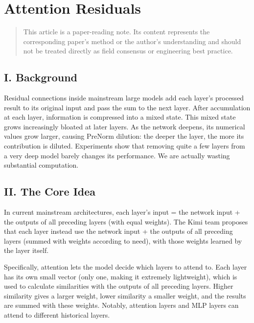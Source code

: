 \setcounter{section}{3}

\hypertarget{attention-residuals}{%
\section{Attention Residuals}\label{attention-residuals}}

\begin{quote}
This article is a paper-reading note. Its content represents the corresponding paper's method or the author's understanding and should not be treated directly as field consensus or engineering best practice.
\end{quote}

\hypertarget{i.-background-3}{%
\subsection{I. Background}\label{i.-background-3}}

Residual connections inside mainstream large models add each layer's processed result to its original input and pass the sum to the next layer. After accumulation at each layer, information is compressed into a mixed state. This mixed state grows increasingly bloated at later layers. As the network deepens, its numerical values grow larger, causing PreNorm dilution: the deeper the layer, the more its contribution is diluted. Experiments show that removing quite a few layers from a very deep model barely changes its performance. We are actually wasting substantial computation.

\hypertarget{ii.-the-core-idea}{%
\subsection{II. The Core Idea}\label{ii.-the-core-idea}}

In current mainstream architectures, each layer's input = the network input + the outputs of all preceding layers (with equal weights). The Kimi team proposes that each layer instead use the network input + the outputs of all preceding layers (summed with weights according to need), with those weights learned by the layer itself.

Specifically, attention lets the model decide which layers to attend to. Each layer has its own small vector (only one, making it extremely lightweight), which is used to calculate similarities with the outputs of all preceding layers. Higher similarity gives a larger weight, lower similarity a smaller weight, and the results are summed with these weights. Notably, attention layers and MLP layers can attend to different historical layers.

